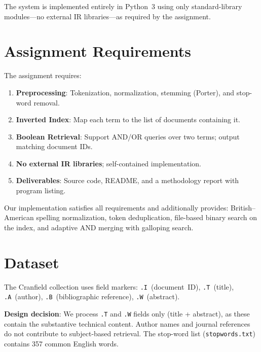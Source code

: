 \documentclass[12pt,a4paper]{article}
\begin{document}
The system is implemented entirely in Python~3 using only standard-library
modules---no external IR libraries---as required by the assignment.

\section{Assignment Requirements}
\label{sec:requirements}

The assignment requires:
\begin{enumerate}[noitemsep]
  \item \textbf{Preprocessing}: Tokenization, normalization, stemming (Porter), and stop-word removal.
  \item \textbf{Inverted Index}: Map each term to the list of documents containing it.
  \item \textbf{Boolean Retrieval}: Support AND/OR queries over two terms; output matching document IDs.
  \item \textbf{No external IR libraries}; self-contained implementation.
  \item \textbf{Deliverables}: Source code, README, and a methodology report with program listing.
\end{enumerate}

Our implementation satisfies all requirements and additionally provides:
British--American spelling normalization, token deduplication,
file-based binary search on the index, and adaptive AND merging with galloping search.

\section{Dataset}
\label{sec:dataset}

The Cranfield collection uses field markers: \texttt{.I}~(document~ID),
\texttt{.T}~(title), \texttt{.A}~(author), \texttt{.B}~(bibliographic reference),
\texttt{.W}~(abstract).

\textbf{Design decision}: We process \texttt{.T} and \texttt{.W} fields only
(title + abstract), as these contain the substantive technical content.
Author names and journal references do not contribute to subject-based retrieval.
The stop-word list (\texttt{stopwords.txt}) contains 357 common English words.
\end{document}
